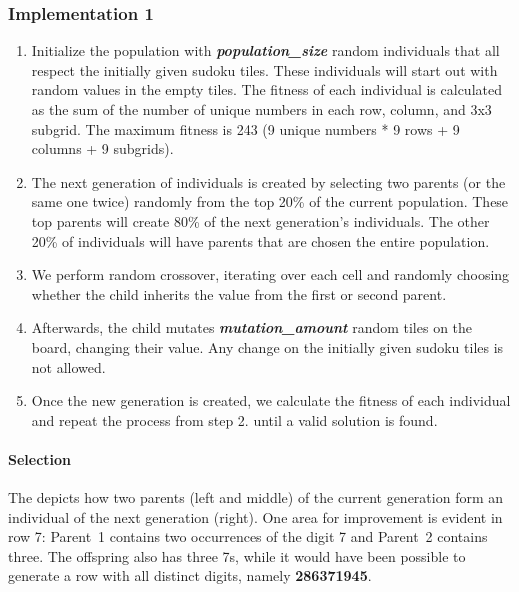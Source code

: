 \subsubsection{Implementation 1}
\begin{enumerate}
\item Initialize the population with \textit{\textbf{population\_size}} random individuals that all respect the initially given sudoku tiles. These individuals will start out with random values in the empty tiles. The fitness of each individual is calculated as the sum of the number of unique numbers in each row, column, and 3x3 subgrid. The maximum fitness is 243 (9 unique numbers * 9 rows + 9 columns + 9 subgrids).
\item The next generation of individuals is created by selecting two parents (or the same one twice) randomly from the top 20\% of the current population. These top parents will create 80\% of the next generation's individuals. The other 20\% of individuals will have parents that are chosen the entire population.
\item We perform random crossover, iterating over each cell and randomly choosing whether the child inherits the value from the first or second parent.
\item Afterwards, the child mutates \textit{\textbf{mutation\_amount}} random tiles on the board, changing their value. Any change on the initially given sudoku tiles is not allowed.
\item Once the new generation is created, we calculate the fitness of each individual and repeat the process from step 2. until a valid solution is found.
\end{enumerate}

\paragraph{Selection} The  depicts how two parents (left and middle) of the current generation form an individual of the next generation (right).
One area for improvement is evident in row 7: Parent~1 contains two occurrences of the digit 7 and Parent~2 contains three. The offspring also has three 7s, while it would have been possible to generate a row with all distinct digits, namely \textbf{286371945}.

